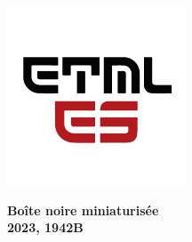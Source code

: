 \onecolumn

\begin{figure}
	\begin{minipage}{0.47\textwidth}
		\centering
		\includegraphics[width=.4\textwidth,left,]{./ETML-ES-LOGO.png}
	\end{minipage}
	
	\hfill
	\begin{minipage}{0.7\textwidth}
		\raggedleft
		\LARGE \textbf{Boîte noire miniaturisée\\ 2023, 1942B}
	\end{minipage}
\end{figure}

